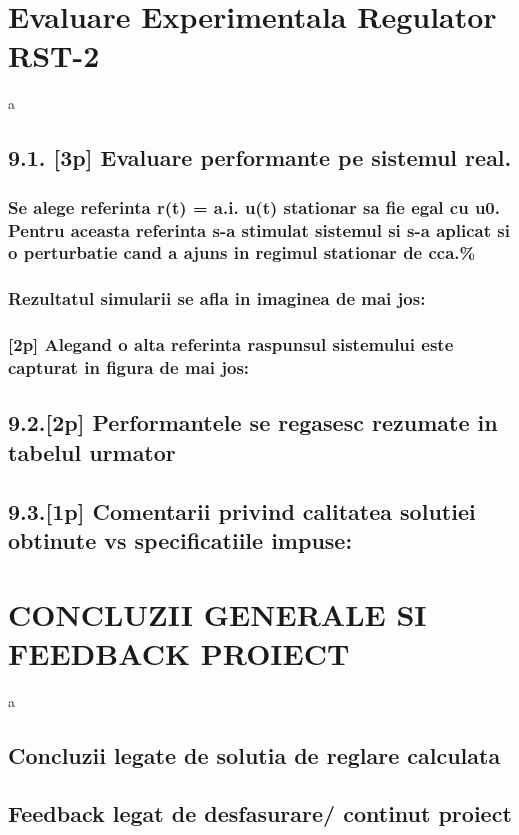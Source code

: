 \documentclass[12pt,english]{article}
\begin{document}
\section { Evaluare Experimentala Regulator RST-2 }
a
\subsection { 9.1. [3p] Evaluare performante pe sistemul real. }
\subsubsection { Se alege referinta r(t) = a.i. u(t) stationar sa fie egal cu u0. Pentru aceasta referinta s-a stimulat sistemul si s-a aplicat si o perturbatie cand a ajuns in regimul stationar de cca.\% }
\subsubsection { Rezultatul simularii se afla in imaginea de mai jos: }
\subsubsection { [2p] Alegand o alta referinta raspunsul sistemului este capturat in figura de mai jos: }
\subsection { 9.2.[2p] Performantele se regasesc rezumate in tabelul urmator }
\subsection { 9.3.[1p] Comentarii privind calitatea solutiei obtinute vs specificatiile impuse: }

\section { CONCLUZII GENERALE SI FEEDBACK PROIECT }
a
\subsection { Concluzii legate de solutia de reglare calculata }
\subsection { Feedback legat de desfasurare/ continut proiect }
\end{document}
